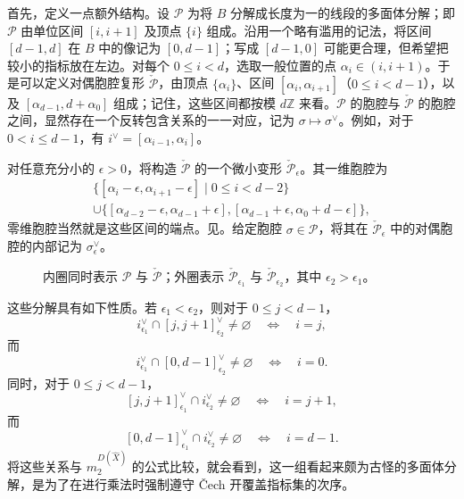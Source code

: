 首先，定义一点额外结构。设 $\mathcal P$ 为将 $B$ 分解成长度为一的线段的多面体分解；即 $\mathcal P$ 由单位区间 $[i,i+1]$ 及顶点 $\{i\}$ 组成。沿用一个略有滥用的记法，将区间 $[d-1,d]$ 在 $B$ 中的像记为 $[0,d-1]$；写成 $[d-1,0]$ 可能更合理，但希望把较小的指标放在左边。对每个 $0\leq i<d$，选取一般位置的点 $\alpha_i\in(i,i+1)$。于是可以定义对偶胞腔复形 $\check{\mathcal P}$，由顶点 $\{\alpha_i\}$、区间 $[\alpha_i,\alpha_{i+1}]$（$0\leq i<d-1$），以及 $[\alpha_{d-1},d+\alpha_0]$ 组成；记住，这些区间都按模 $d\mathbb Z$ 来看。$\mathcal P$ 的胞腔与 $\check{\mathcal P}$ 的胞腔之间，显然存在一个反转包含关系的一一对应，记为 $\sigma\mapsto\sigma^\vee$。例如，对于 $0<i\leq d-1$，有 $i^\vee=[\alpha_{i-1},\alpha_i]$。

对任意充分小的 $\epsilon>0$，将构造 $\check{\mathcal P}$ 的一个微小变形 $\check{\mathcal P}_\epsilon$。其一维胞腔为
\[
\begin{gathered}
\{[\alpha_i-\epsilon,\alpha_{i+1}-\epsilon]\mid0\leq i<d-2\}\\
\cup\{[\alpha_{d-2}-\epsilon,\alpha_{d-1}+\epsilon],
[\alpha_{d-1}+\epsilon,\alpha_0+d-\epsilon]\},
\end{gathered}
\]
零维胞腔当然就是这些区间的端点。见。给定胞腔 $\sigma\in\mathcal P$，将其在 $\check{\mathcal P}_\epsilon$ 中的对偶胞腔的内部记为 $\sigma_\epsilon^\vee$。
\begin{figure}[H]
\centering
{}
\caption{内圈同时表示 $\mathcal P$ 与 $\check{\mathcal P}$；外圈表示 $\check{\mathcal P}_{\epsilon_1}$ 与 $\check{\mathcal P}_{\epsilon_2}$，其中 $\epsilon_2>\epsilon_1$。}\label{fig:8.37}
\end{figure}

这些分解具有如下性质。若 $\epsilon_1<\epsilon_2$，则对于 $0\leq j<d-1$，
\[
i_{\epsilon_1}^\vee\cap[j,j+1]_{\epsilon_2}^\vee\ne\varnothing
\quad\Longleftrightarrow\quad i=j,
\]
而
\[
i_{\epsilon_1}^\vee\cap[0,d-1]_{\epsilon_2}^\vee\ne\varnothing
\quad\Longleftrightarrow\quad i=0.
\]
同时，对于 $0\leq j<d-1$，
\[
[j,j+1]_{\epsilon_1}^\vee\cap i_{\epsilon_2}^\vee\ne\varnothing
\quad\Longleftrightarrow\quad i=j+1,
\]
而
\[
[0,d-1]_{\epsilon_1}^\vee\cap i_{\epsilon_2}^\vee\ne\varnothing
\quad\Longleftrightarrow\quad i=d-1.
\]
将这些关系与 $m_2^{D(\widehat X)}$ 的公式比较，就会看到，这一组看起来颇为古怪的多面体分解，是为了在进行乘法时强制遵守 \v{C}ech 开覆盖指标集的次序。

